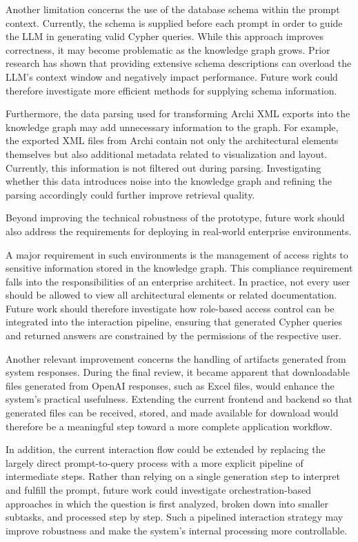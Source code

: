 Another limitation concerns the use of the database schema within the prompt context. Currently, the schema is supplied before each prompt in order to guide the LLM in generating valid Cypher queries. While this approach improves correctness, it may become problematic as the knowledge graph grows. Prior research has shown that providing extensive schema descriptions can overload the LLM's context window and negatively impact performance. \cite{wan2025prompting, mihindukulasooriya2023text2kgbench} Future work could therefore investigate more efficient methods for supplying schema information.

Furthermore, the data parsing used for transforming Archi XML exports into the knowledge graph may add unnecessary information to the graph. For example, the exported XML files from Archi contain not only the architectural elements themselves but also additional metadata related to visualization and layout. Currently, this information is not filtered out during parsing. Investigating whether this data introduces noise into the knowledge graph and refining the parsing accordingly could further improve retrieval quality.

Beyond improving the technical robustness of the prototype, future work should also address the requirements for deploying \prototype{} in real-world enterprise environments.

A major requirement in such environments is the management of access rights to sensitive information stored in the knowledge graph. This compliance requirement falls into the responsibilities of an enterprise architect. In practice, not every user should be allowed to view all architectural elements or related documentation. Future work should therefore investigate how role-based access control can be integrated into the interaction pipeline, ensuring that generated Cypher queries and returned answers are constrained by the permissions of the respective user.

Another relevant improvement concerns the handling of artifacts generated from system responses. During the final review, it became apparent that downloadable files generated from OpenAI responses, such as Excel files, would enhance the system's practical usefulness. Extending the current frontend and backend so that generated files can be received, stored, and made available for download would therefore be a meaningful step toward a more complete application workflow.

In addition, the current interaction flow could be extended by replacing the largely direct prompt-to-query process with a more explicit pipeline of intermediate steps. Rather than relying on a single generation step to interpret and fulfill the prompt, future work could investigate orchestration-based approaches in which the question is first analyzed, broken down into smaller subtasks, and processed step by step. Such a pipelined interaction strategy may improve robustness and make the system’s internal processing more controllable.

